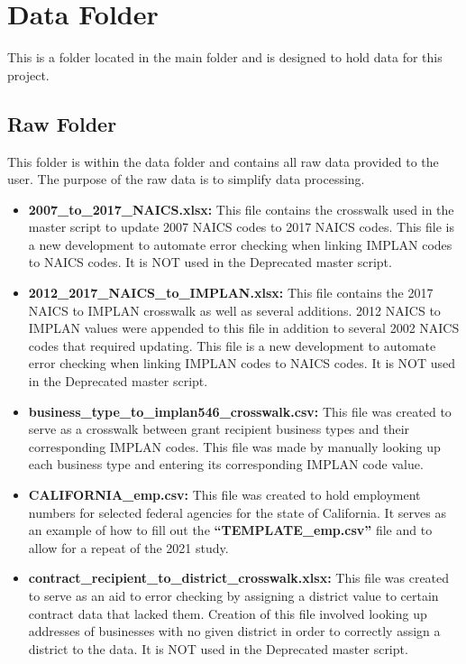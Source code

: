 \documentclass[
]{book}
\providecommand{\tightlist}{%
  \setlength{\itemsep}{0pt}\setlength{\parskip}{0pt}}
\begin{document}
\hypertarget{data-folder}{%
\section{Data Folder}\label{data-folder}}

This is a folder located in the main folder and is designed to hold data for this project.

\hypertarget{raw-folder}{%
\subsection{Raw Folder}\label{raw-folder}}

This folder is within the data folder and contains all raw data provided to the user. The purpose of the raw data is to simplify data processing.

\begin{itemize}
\tightlist
\item
  \textbf{2007\_to\_2017\_NAICS.xlsx:} This file contains the crosswalk used in the master script to update 2007 NAICS codes to 2017 NAICS codes. This file is a new development to automate error checking when linking IMPLAN codes to NAICS codes. It is NOT used in the Deprecated master script.
\item
  \textbf{2012\_2017\_NAICS\_to\_IMPLAN.xlsx:} This file contains the 2017 NAICS to IMPLAN crosswalk as well as several additions. 2012 NAICS to IMPLAN values were appended to this file in addition to several 2002 NAICS codes that required updating. This file is a new development to automate error checking when linking IMPLAN codes to NAICS codes. It is NOT used in the Deprecated master script.
\item
  \textbf{business\_type\_to\_implan546\_crosswalk.csv:} This file was created to serve as a crosswalk between grant recipient business types and their corresponding IMPLAN codes. This file was made by manually looking up each business type and entering its corresponding IMPLAN code value.
\item
  \textbf{CALIFORNIA\_emp.csv:} This file was created to hold employment numbers for selected federal agencies for the state of California. It serves as an example of how to fill out the \textbf{``TEMPLATE\_emp.csv''} file and to allow for a repeat of the 2021 study.\\
\item
  \textbf{contract\_recipient\_to\_district\_crosswalk.xlsx:} This file was created to serve as an aid to error checking by assigning a district value to certain contract data that lacked them. Creation of this file involved looking up addresses of businesses with no given district in order to correctly assign a district to the data. It is NOT used in the Deprecated master script.\\

\end{itemize}
\end{document}

